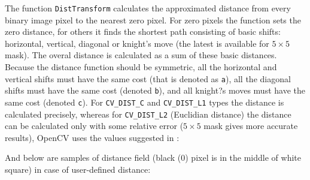\begin{description}
\end{description}

The function \texttt{DistTransform} calculates the approximated
distance from every binary image pixel to the nearest zero pixel.
For zero pixels the function sets the zero distance, for others it
finds the shortest path consisting of basic shifts: horizontal,
vertical, diagonal or knight's move (the latest is available for
$5\times 5$ mask). The overal distance is calculated as a sum of these
basic distances. Because the distance function should be symmetric,
all the horizontal and vertical shifts must have the same cost (that
is denoted as \texttt{a}), all the diagonal shifts must have the
same cost (denoted \texttt{b}), and all knight?s moves must have
the same cost (denoted \texttt{c}). For \texttt{CV\_DIST\_C} and
\texttt{CV\_DIST\_L1} types the distance is calculated precisely,
whereas for \texttt{CV\_DIST\_L2} (Euclidian distance) the distance
can be calculated only with some relative error ($5\times 5$ mask
gives more accurate results), OpenCV uses the values suggested in
\cite{Borgefors86}:

\begin{description}
\end{description}

And below are samples of distance field (black (0) pixel is in the middle of white square) in case of user-defined distance:

